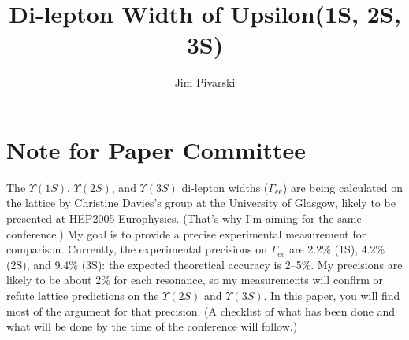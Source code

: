 \documentclass[12pt]{article}
\title{Di-lepton Width of Upsilon(1S, 2S, 3S)}
\author{Jim Pivarski}
\begin{document}
\newcommand{\subs}[1]{{\mbox{\scriptsize #1}}}

\newcommand{\dxy}{$d_{XY}$}
\newcommand{\dz}{$d_Z$}
\newcommand{\pone}{$|\vec{p}_1|$}
\newcommand{\ptwo}{$|\vec{p}_2|$}
\newcommand{\eone}{$E_1$}
\newcommand{\etwo}{$E_2$}
\newcommand{\eisr}{$E_{\mbox{\scriptsize ISR}}$}
\newcommand{\visen}{$E_{\mbox{\scriptsize vis}}$}
\newcommand{\hotvisen}{$E_{\mbox{\scriptsize vis}}^{\mbox{\scriptsize hot}}$}
\newcommand{\lfourdec}{L4$_{\mbox{\scriptsize dec}}$}
\newcommand{\pdotp}{$|\vec{p}_1\cdot\vec{p}_2|$}
\newcommand{\ebeam}{$E_{\mbox{\scriptsize beam}}$}
\newcommand{\ecom}{$E_{\mbox{\scriptsize COM}}$}
\newcommand{\pz}{$\sum p_z$}

\newcommand{\scosmic}{$s_{\mbox{\scriptsize cosmic}}$}

\setlength{\baselineskip}{0.9 cm}

\setcounter{page}{1}
\pagestyle{plain}

\maketitle

\section*{Note for Paper Committee}

The $\Upsilon(1S)$, $\Upsilon(2S)$, and $\Upsilon(3S)$ di-lepton
widths ($\Gamma_{ee}$) are being calculated on the lattice by
Christine Davies's group at the University of Glasgow, likely to be
presented at HEP2005 Europhysics.  (That's why I'm aiming for the
same conference.)  My goal is to provide a precise experimental
measurement for comparison.  Currently, the experimental precisions on
$\Gamma_{ee}$ are 2.2\% (1S), 4.2\% (2S), and 9.4\% (3S): the expected
theoretical accuracy is 2--5\%.  My precisions are likely to be about
2\% for each resonance, so my measurements will confirm or refute
lattice predictions on the $\Upsilon(2S)$ and $\Upsilon(3S)$.  In this
paper, you will find most of the argument for that precision.  (A
checklist of what has been done and what will be done by the time of
the conference will follow.)
\end{document}

